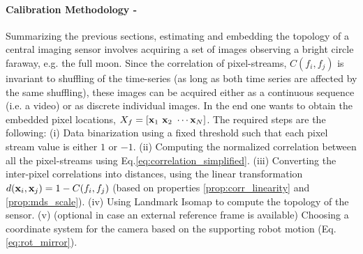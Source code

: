 %
%


\paragraph{Calibration Methodology -}

Summarizing the previous sections, estimating and embedding the topology of a central imaging sensor involves acquiring a set of images observing a bright circle faraway, e.g. the full moon. Since the correlation of pixel-streams, $C(f_i,f_j)$ is invariant to shuffling of the time-series (as long as both time series are affected by the same shuffling), these images can be acquired either as a continuous sequence (i.e. a video) or as discrete individual images. In the end one wants to obtain the embedded pixel locations, $X_f= [\mathbf{x}_1\ \mathbf{x}_2\ \cdots \mathbf{x}_N]$.
%
The required steps are the following:
%
(i) Data binarization using a fixed threshold such that each pixel stream value is either $1$ or $-1$.
%
(ii) Computing the normalized correlation between all the pixel-streams using Eq.\ref{eq:correlation_simplified}.
%
(iii) Converting the inter-pixel correlations into distances, using the linear transformation $d(\mathbf{x}_i,\mathbf{x}_j)=1-C(f_i,f_j)$ (based on properties \ref{prop:corr_linearity} and \ref{prop:mds_scale}).
%
(iv) Using Landmark Isomap to compute the topology of the sensor. 
%
(v) (optional in case an external reference frame is available) Choosing a coordinate system for the camera based on the supporting robot motion (Eq.\ref{eq:rot_mirror}). 
